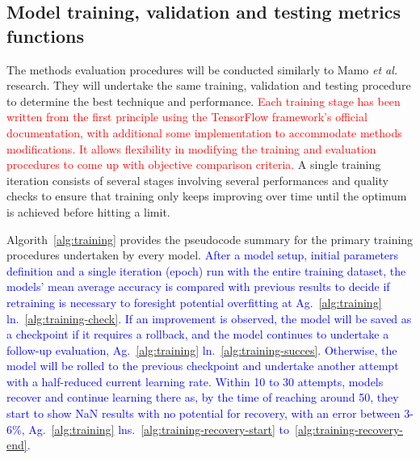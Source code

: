 \subsection{Model training, validation and testing metrics functions} \label{subsec:t_model}
%
The methods evaluation procedures will be conducted similarly to Mamo \textit{et al.}~\cite{mamo_long_2020} research.
They will undertake the same training, validation and testing procedure to determine the best technique and performance.
\textcolor{red}{Each training stage has been written from the first principle using the TensorFlow framework's official documentation, with additional some implementation to accommodate methods modifications\cite{}.
It allows flexibility in modifying the training and evaluation procedures to come up with objective comparison criteria.}
A single training iteration consists of several stages involving several performances and quality checks to ensure that training only keeps improving over time until the optimum is achieved before hitting a limit.

%
Algorith~\ref{alg:training} provides the pseudocode summary for the primary training procedures undertaken by every model.
\textcolor{blue}{
After a model setup, initial parameters definition and a single iteration (epoch) run with the entire training dataset, the models' mean average accuracy is compared with previous results to decide if retraining is necessary to foresight potential overfitting at Ag.~\ref{alg:training} ln.~\ref{alg:training-check}.
If an improvement is observed, the model will be saved as a checkpoint if it requires a rollback, and the model continues to undertake a follow-up evaluation, Ag.~\ref{alg:training} ln.~\ref{alg:training-succes}.
Otherwise, the model will be rolled to the previous checkpoint and undertake another attempt with a half-reduced current learning rate.
Within 10 to 30 attempts, models recover and continue learning there as, by the time of reaching around 50, they start to show NaN results with no potential for recovery, with an error between 3-6\%, Ag.~\ref{alg:training} lns.~\ref{alg:training-recovery-start} to~\ref{alg:training-recovery-end}.
}

